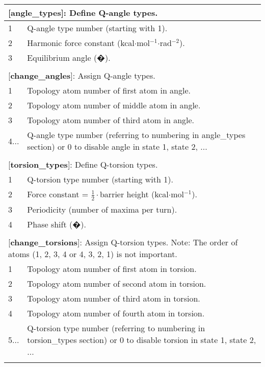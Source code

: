 \documentclass[a4paper,10pt]{article}
\begin{document}
\begin{longtable}{|p{53pt}|p{181pt}|p{160pt}|}
\multicolumn{3}{p{394pt}}{[\textbf{angle\_types}]: Define Q-angle types.}\\
\hline 1 & \multicolumn{2}{p{341pt}|}{Q-angle type number (starting with 1).}\\
\hline 2 & \multicolumn{2}{p{341pt}|}{Harmonic force constant (kcal$\cdot$mol$^{-1}$$\cdot$rad$^{-2}$).}\\
\hline 3 & \multicolumn{2}{p{341pt}|}{Equilibrium angle (�).}\\
\hline
\multicolumn{3}{p{394pt}}{}\\

\multicolumn{3}{p{394pt}}{[\textbf{change\_angles}]: Assign Q-angle types.}\\
\hline 1 & \multicolumn{2}{p{341pt}|}{Topology atom number of first atom in angle.}\\
\hline 2 & \multicolumn{2}{p{341pt}|}{Topology atom number of middle atom in angle.}\\
\hline 3 & \multicolumn{2}{p{341pt}|}{Topology atom number of third atom in angle.}\\
\hline 4... & \multicolumn{2}{p{341pt}|}{Q-angle type number (referring to numbering in angle\_types section) or 0 to disable angle in state 1, state 2, ...}\\
\hline
\multicolumn{3}{p{394pt}}{}\\

\multicolumn{3}{p{394pt}}{[\textbf{torsion\_types}]: Define Q-torsion types.}\\
\hline 1 & \multicolumn{2}{p{341pt}|}{Q-torsion type number (starting with 1).}\\
\hline 2 & \multicolumn{2}{p{341pt}|}{Force constant = $\frac{1}{2}\cdot$barrier height (kcal$\cdot$mol$^{-1}$).}\\
\hline 3 & \multicolumn{2}{p{341pt}|}{Periodicity (number of maxima per turn).}\\
\hline 4 & \multicolumn{2}{p{341pt}|}{Phase shift (�).}\\
\hline
\multicolumn{3}{p{394pt}}{}\\

\multicolumn{3}{p{394pt}}{[\textbf{change\_torsions}]: Assign Q-torsion types. Note: The order of atoms (1, 2, 3, 4 or 4, 3, 2, 1) is not important.}\\
\hline 1 & \multicolumn{2}{p{341pt}|}{Topology atom number of first atom in torsion.}\\
\hline 2 & \multicolumn{2}{p{341pt}|}{Topology atom number of second atom in torsion.}\\
\hline 3 & \multicolumn{2}{p{341pt}|}{Topology atom number of third atom in torsion.}\\
\hline 4 & \multicolumn{2}{p{341pt}|}{Topology atom number of fourth atom in torsion.}\\
\hline 5... & \multicolumn{2}{p{341pt}|}{Q-torsion type number (referring to numbering in torsion\_types section) or 0 to disable torsion in state 1, state 2, ...}\\
\hline
\multicolumn{3}{p{394pt}}{}\\


\end{longtable}
\end{document}
